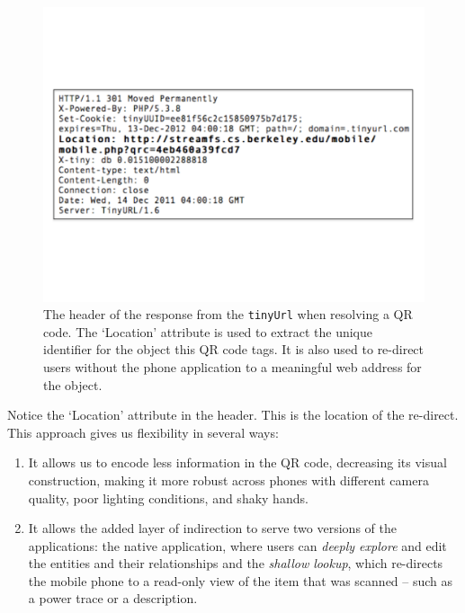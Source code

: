 \begin{figure}[htb!]
\begin{center}
\includegraphics[scale=0.30]{figs/tinyurlhdr}
\caption{The header of the response from the {\tt tinyUrl} when resolving a QR code.  The `Location' attribute
is used to extract the unique identifier for the object this QR code tags.  It is also used to re-direct
users without the phone application to a meaningful web address for the object.}
\label{fig:tinyurlhdr}
\end{center}
\end{figure}


Notice the `Location' attribute in the header.  This is the location of the re-direct.  This approach gives us
flexibility in several ways:

\begin{enumerate}
\item It allows us to encode less information in the QR code, decreasing its visual construction, making it more
		robust across phones with different camera quality, poor lighting conditions, and shaky hands.
\item It allows the added layer of indirection to serve two versions of the applications:  the native application,
		where users can \emph{deeply explore} and edit the entities and their relationships and the \emph{shallow lookup}, 
		which re-directs the mobile phone to a read-only view of the item that was scanned -- such as a power trace or 
		a description.
\end{enumerate}



